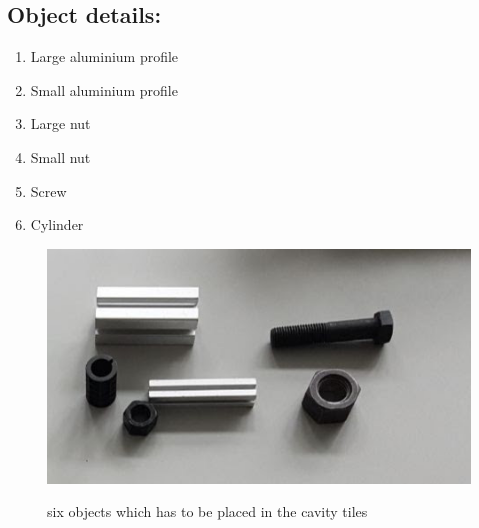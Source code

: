 \documentclass{article}
\begin{document}
\subsection{Object details:}
\begin{enumerate}
\item Large aluminium profile
\item Small aluminium profile
\item Large nut
\item Small nut
\item Screw
\item Cylinder 
\end{enumerate}
\begin{figure}[h!]
\begin{center}
\includegraphics[scale=0.5]{images/AllParts.jpg}
\label{fig:Objects} 
\end{center}
\caption{six objects which has to be placed in the cavity tiles \cite{second} }
\end{figure}
\end{document}
